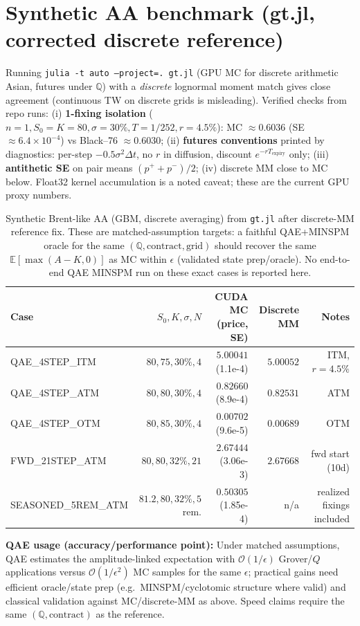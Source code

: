 \documentclass[11pt,a4paper]{article}
\begin{document}
\section{Synthetic AA benchmark (gt.jl, corrected discrete reference)}
Running \texttt{julia -t auto --project=. gt.jl} (GPU MC for discrete arithmetic Asian, futures under $\mathbb{Q}$) with a \emph{discrete} lognormal moment match gives close agreement (continuous TW on discrete grids is misleading). Verified checks from repo runs: (i) \textbf{1-fixing isolation} ($n{=}1, S_0{=}K{=}80,\sigma{=}30\%,T{=}1/252,r{=}4.5\%$): MC $\approx 0.6036$ (SE $\approx 6.4\times10^{-4}$) vs Black--76 $\approx 0.6030$; (ii) \textbf{futures conventions} printed by diagnostics: per-step $-0.5\sigma^2\Delta t$, no $r$ in diffusion, discount $e^{-rT_{\text{expiry}}}$ only; (iii) \textbf{antithetic SE} on pair means $(p^++p^-)/2$; (iv) discrete MM close to MC below. Float32 kernel accumulation is a noted caveat; these are the current GPU proxy numbers.

\begin{table}[h]
\centering
\small
\begin{tabular}{lrrrr}
\toprule
Case & $S_0,K,\sigma,N$ & CUDA MC (price, SE) & Discrete MM & Notes \\
\midrule
QAE\_4STEP\_ITM & $80,75,30\%,4$ & $5.00041$ (1.1e-4) & $5.00052$ & ITM, $r{=}4.5\%$ \\
QAE\_4STEP\_ATM & $80,80,30\%,4$ & $0.82660$ (8.9e-4) & $0.82531$ & ATM \\
QAE\_4STEP\_OTM & $80,85,30\%,4$ & $0.00702$ (9.6e-5) & $0.00689$ & OTM \\
FWD\_21STEP\_ATM & $80,80,32\%,21$ & $2.67444$ (3.06e-3) & $2.67668$ & fwd start (10d) \\
SEASONED\_5REM\_ATM & $81.2,80,32\%,5$ rem. & $0.50305$ (1.85e-4) & n/a & realized fixings included \\
\bottomrule
\end{tabular}
\caption{Synthetic Brent-like AA (GBM, discrete averaging) from \texttt{gt.jl} after discrete-MM reference fix. These are matched-assumption targets: a faithful QAE+MINSPM oracle for the same $(\mathbb{Q},\text{contract},\text{grid})$ should recover the same $\mathbb{E}[\max(A-K,0)]$ as MC within $\epsilon$ (validated state prep/oracle). No end-to-end QAE MINSPM run on these exact cases is reported here.}
\label{tab:gtbench}
\end{table}

\textbf{QAE usage (accuracy/performance point):} Under matched assumptions, QAE estimates the amplitude-linked expectation with $\mathcal{O}(1/\epsilon)$ Grover/$Q$ applications versus $\mathcal{O}(1/\epsilon^2)$ MC samples for the same $\epsilon$; practical gains need efficient oracle/state prep (e.g.\ MINSPM/cyclotomic structure where valid) and classical validation against MC/discrete-MM as above. Speed claims require the same $(\mathbb{Q},\text{contract})$ as the reference.
\end{document}
